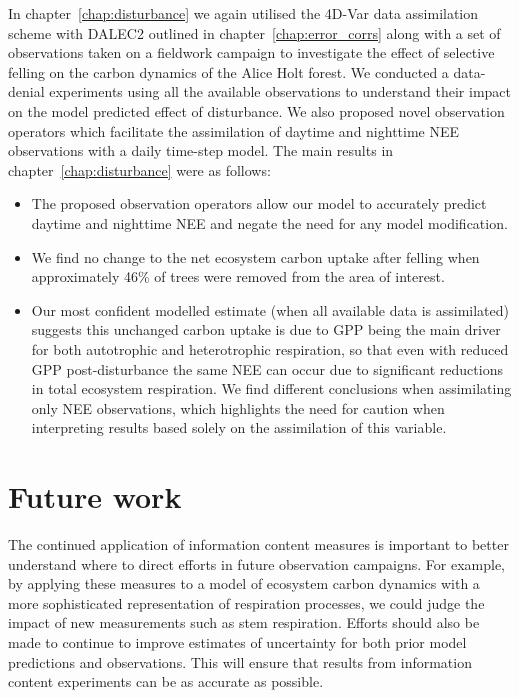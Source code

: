 In chapter~\ref{chap:disturbance} we again utilised the 4D-Var data assimilation scheme with DALEC2 outlined in chapter~\ref{chap:error_corrs} along with a set of observations taken on a fieldwork campaign to investigate the effect of selective felling on the carbon dynamics of the Alice Holt forest. We conducted a data-denial experiments using all the available observations to understand their impact on the model predicted effect of disturbance. We also proposed novel observation operators which facilitate the assimilation of daytime and nighttime NEE observations with a daily time-step model. The main results in chapter~\ref{chap:disturbance} were as follows:
\begin{itemize}
\item The proposed observation operators allow our model to accurately predict daytime and nighttime NEE and negate the need for any model modification. 
\item We find no change to the net ecosystem carbon uptake after felling when approximately 46\% of trees were removed from the area of interest.
\item Our most confident modelled estimate (when all available data is assimilated) suggests this unchanged carbon uptake is due to GPP being the main driver for both autotrophic and heterotrophic respiration, so that even with reduced GPP post-disturbance the same NEE can occur due to significant reductions in total ecosystem respiration. We find different conclusions when assimilating only NEE observations, which highlights the need for caution when interpreting results based solely on the assimilation of this variable. 
\end{itemize}

\section{Future work}

The continued application of information content measures is important to better understand where to direct efforts in future observation campaigns. For example, by applying these measures to a model of ecosystem carbon dynamics with a more sophisticated representation of respiration processes, we could judge the impact of new measurements such as stem respiration. Efforts should also be made to continue to improve estimates of uncertainty for both prior model predictions and observations. This will ensure that results from information content experiments can be as accurate as possible. 

